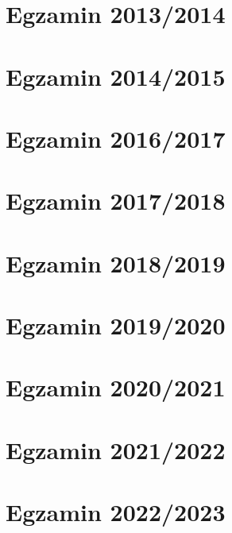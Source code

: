 \section{Egzamin 2013/2014}


\section{Egzamin 2014/2015}


\section{Egzamin 2016/2017}


\section{Egzamin 2017/2018}


\section{Egzamin 2018/2019}


\section{Egzamin 2019/2020}


\section{Egzamin 2020/2021}


\section{Egzamin 2021/2022}


\section{Egzamin 2022/2023}

